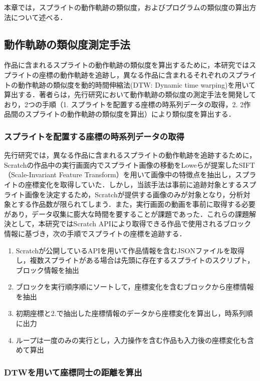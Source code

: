 \documentclass[T,J]{fose} %
\begin{document}
本章では，スプライトの動作軌跡の類似度，およびプログラムの類似度の算出方法について述べる．

\subsection{動作軌跡の類似度測定手法}\label{subsec:Similarity movement measurement}

作品に含まれるスプライトの動作軌跡の類似度を算出するために，本研究ではスプライトの座標の動作軌跡を追跡し，異なる作品に含まれるそれぞれのスプライトの動作軌跡の類似度を動的時間伸縮法(DTW: Dynamic time warping)を用いて算出する．著者らは，先行研究\cite{Fukuchi2021}において動作軌跡の類似度の測定手法を開発しており，2つの手順（1. スプライトを配置する座標の時系列データの取得，2. 2作品間のスプライトの動作軌跡の類似度を算出）により類似度を算出する．

\subsubsection{スプライトを配置する座標の時系列データの取得}

先行研究\cite{Fukuchi2021}では，異なる作品に含まれるスプライトの動作軌跡を追跡するために，Scratchの作品中の実行画面内でスプライト画像の移動をLoweらが提案したSIFT（Scale-Invariant Feature Transform）\cite{lowe1999object}を用いて画像中の特徴点を抽出し，スプライトの座標変化を取得していた．しかし，当該手法は事前に追跡対象とするスプライト画像を決定するため，Scratchが提供する画像のみが対象となり，分析対象とする作品数が限られてしまう．また，実行画面の動画を事前に取得する必要があり，データ収集に膨大な時間を要することが課題であった．これらの課題解決として，本研究ではScratch APIにより取得できる作品で使用されるブロック情報に基づき，次の手順でスプライトの座標を追跡する．
\begin{enumerate}
    \item Scratchが公開しているAPIを用いて作品情報を含むJSONファイルを取得し，複数スプライトがある場合は先頭に存在するスプライトのスクリプト，ブロック情報を抽出
    \item ブロックを実行順序順にソートして，座標変化を含むブロックから座標情報を抽出
    \item 初期座標と2.で抽出した座標情報のデータから座標変化を算出し，時系列順に出力
    \item ループは一度のみの実行とし，入力操作を含む作品も入力後の座標変化も含めて算出
\end{enumerate}

\subsubsection{DTWを用いて座標同士の距離を算出}
\end{document}
